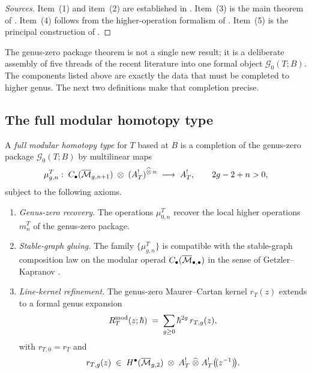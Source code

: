 \begin{proof}[Sources]
Item~\textup{(1)} and item~\textup{(2)} are established in
\cite{CDG20}. Item~\textup{(3)} is the main theorem of \cite{Zeng23}. Item~\textup{(4)}
follows from the higher-operation formalism of \cite{GKW24}. Item~\textup{(5)} is the
principal construction of \cite{DNP25}.
\end{proof}

\begin{remark}
The genus-zero package theorem is not a single new result; it is a deliberate assembly of five
threads of the recent literature into one formal object $\mathcal G_0(T;B)$. The components listed above are exactly the data that must be completed to higher genus.
The next two definitions make that completion precise.
\end{remark}

\subsection{The full modular homotopy type}

\begin{definition}
A \emph{full modular homotopy type} for $T$ based at $B$ is a completion of the genus-zero
package $\mathcal G_0(T;B)$ by multilinear maps
\begin{equation}
\mu_{g,n}^T:\;
C_\bullet(\overline{\mathcal M}_{g,n+1})\;\otimes\;(A_T^!)^{\widehat\otimes\, n}
\;\longrightarrow\;A_T^!,
\qquad 2g-2+n>0,
\end{equation}
subject to the following axioms.
\begin{enumerate}[label=\textup{(\alph*)}]
\item \emph{Genus-zero recovery.} The operations $\mu_{0,n}^T$ recover the local higher
operations $m_n^T$ of the genus-zero package.

\item \emph{Stable-graph gluing.} The family $\{\mu_{g,n}^T\}$ is compatible with the
stable-graph composition law on the modular operad
$C_\bullet(\overline{\mathcal M}_{\bullet,\bullet})$ in the sense of Getzler--Kapranov \cite{GeK98}.

\item \emph{Line-kernel refinement.} The genus-zero Maurer--Cartan kernel $r_T(z)$ extends to
a formal genus expansion
\begin{equation}
R_T^{\mathrm{mod}}(z;\hbar)
\;=\;\sum_{g\ge 0}\hbar^{2g}\,r_{T,g}(z),
\end{equation}
with $r_{T,0}=r_T$ and
\[
r_{T,g}(z)\;\in\;
H^\bullet(\overline{\mathcal M}_{g,2})\;\otimes\;A_T^!\;\widehat\otimes\;A_T^!\bigl(\!(z^{-1})\!\bigr).
\]
\end{enumerate}
\end{definition}

